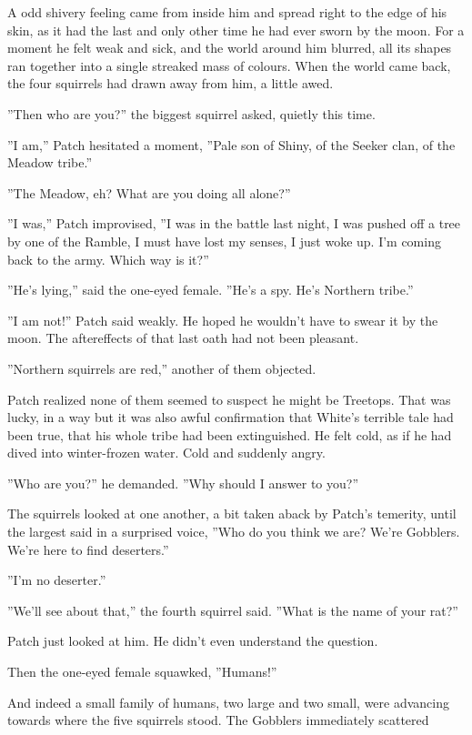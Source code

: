 \documentclass[11pt]{article}
\begin{document}
 A odd shivery feeling came from inside him and spread right to the edge of his skin, as it had the last and only other time he had ever sworn by the moon. For a moment he felt weak and sick, and the world around him blurred, all its shapes ran together into a single streaked mass of colours. When the world came back, the four squirrels had drawn away from him, a little awed.\par
 ''Then who are you?'' the biggest squirrel asked, quietly this time.\par
 ''I am,'' Patch hesitated a moment, ''Pale son of Shiny, of the Seeker clan, of the Meadow tribe.''\par
 ''The Meadow, eh? What are you doing all alone?''\par
 ''I was,'' Patch improvised, ''I was in the battle last night, I was pushed off a tree by one of the Ramble, I must have lost my senses, I just woke up. I'm coming back to the army. Which way is it?''\par
 ''He's lying,'' said the one-eyed female. ''He's a spy. He's Northern tribe.''\par
 ''I am not!'' Patch said weakly. He hoped he wouldn't have to swear it by the moon. The aftereffects of that last oath had not been pleasant. \par
 ''Northern squirrels are red,'' another of them objected.\par
 Patch realized none of them seemed to suspect he might be Treetops. That was lucky, in a way %
 but it was also awful confirmation that White's terrible tale had been true, that his whole tribe had been extinguished. He felt cold, as if he had dived into winter-frozen water. Cold and suddenly angry.\par
 ''Who are you?'' he demanded. ''Why should I answer to you?''\par
 The squirrels looked at one another, a bit taken aback by Patch's temerity, until the largest said in a surprised voice, ''Who do you think we are? We're Gobblers. We're here to find deserters.''\par
 ''I'm no deserter.''\par
 ''We'll see about that,'' the fourth squirrel said. ''What is the name of your rat?''\par
 Patch just looked at him. He didn't even understand the question.\par
 Then the one-eyed female squawked, ''Humans!''\par
 And indeed a small family of humans, two large and two small, were advancing towards where the five squirrels stood. The Gobblers immediately scattered %
\end{document}
